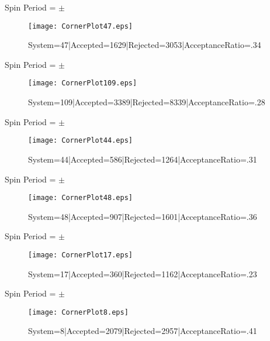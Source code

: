 \documentclass[10pt]{article}
\begin{document}
\begin{center}
        Spin Period = $\pm$ 
\begin{figure}[h] 
        \texttt{[image: CornerPlot47.eps]}
        \caption{System=47|Accepted=1629|Rejected=3053|AcceptanceRatio=.34}
        \label{S47}
        \centering
        \end{figure}
        \end{center}
\begin{center}
        Spin Period = $\pm$ 
\begin{figure}[h] 
        \texttt{[image: CornerPlot109.eps]}
        \caption{System=109|Accepted=3389|Rejected=8339|AcceptanceRatio=.28}
        \label{S109}
        \centering
        \end{figure}
        \end{center}
\begin{center}
        Spin Period = $\pm$ 
\begin{figure}[h] 
        \texttt{[image: CornerPlot44.eps]}
        \caption{System=44|Accepted=586|Rejected=1264|AcceptanceRatio=.31}
        \label{S44}
        \centering
        \end{figure}
        \end{center}
\begin{center}
        Spin Period = $\pm$ 
\begin{figure}[h] 
        \texttt{[image: CornerPlot48.eps]}
        \caption{System=48|Accepted=907|Rejected=1601|AcceptanceRatio=.36}
        \label{S48}
        \centering
        \end{figure}
        \end{center}
\begin{center}
        Spin Period = $\pm$ 
\begin{figure}[h] 
        \texttt{[image: CornerPlot17.eps]}
        \caption{System=17|Accepted=360|Rejected=1162|AcceptanceRatio=.23}
        \label{S17}
        \centering
        \end{figure}
        \end{center}
\begin{center}
        Spin Period = $\pm$ 
\begin{figure}[h] 
        \texttt{[image: CornerPlot8.eps]}
        \caption{System=8|Accepted=2079|Rejected=2957|AcceptanceRatio=.41}
        \label{S8}
        \centering
        \end{figure}
        \end{center}
\end{document}
